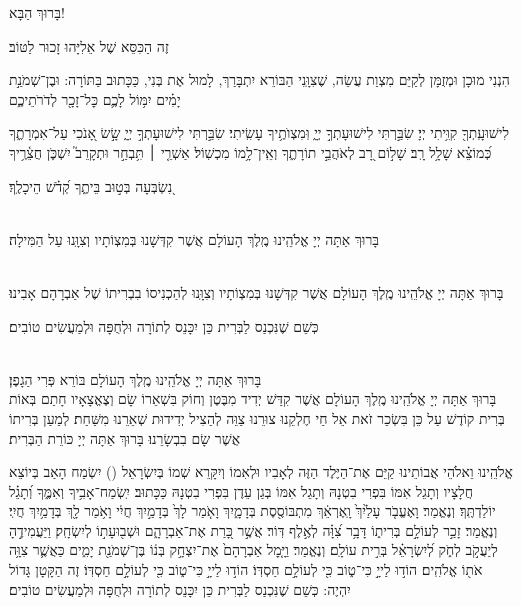 \documentclass[twoside, openany, parskip=half, 11pt]{book}
\begin{document}
\begin{Large}
בָּרוּךְ הַבָּא!

\end{Large}



זֶה הַכִּסֵּא שֶׁל אֵלִיָּהוּ זָכוּר לַטּוֹב׃

הִנְנִי מוּכָן וּמְזֻמָּן לְקַיֵּם מִצְוַת עֲשֵׂה, שֶׁצִוָּֽנִי הַבּוֹרֵא יִתְבָּרַךְ, לָמוּל אֶת בְּנִי, כַּכָּתוּב בַּתּוֹרָה:
וּבֶן־שְׁמֹנַ֣ת יָמִ֗ים יִמּ֥וֹל לָכֶ֛ם כׇּל־זָכָ֖ר לְדֹרֹתֵיכֶ֑ם

%
לִישׁוּעָֽתְךָ֖ קִוִּ֥יתִי יְיָ׃
שִׂבַּ֣רְתִּי לִישׁוּעָתְךָ֣ יְיָ֑ וּֽמִצְוֺתֶ֥יךָ עָשִֽׂיתִי׃ שִׂבַּ֣רְתִּי לִישׁוּעָתְךָ֣ יְיָ֑
שָׂ֣שׂ אָ֭נֹכִי עַל־אִמְרָתֶ֑ךָ כְּ֝מוֹצֵ֗א שָׁלָ֥ל רָֽב׃
שָׁל֣וֹם רָ֭ב לְאֹהֲבֵ֣י תוֹרָתֶ֑ךָ וְאֵֽין־לָ֥מוֹ מִכְשֽׁוֹל׃
אַשְׁרֵ֤י ׀ תִּ֥בְחַ֣ר וּתְקָרֵב֮ יִשְׁכֹּ֢ן חֲצֵ֫רֶ֥יךָ

\kahal
נִ֭שְׂבְּעָה בְּט֣וּב בֵּיתֶ֑ךָ קְ֝דֹ֗שׁ הֵיכָלֶֽךָ׃

\\
בָּרוּךְ אַתָּה יְיָ אֱלֹהֵֽינוּ מֶֽלֶךְ הָעוֹלָם אֲשֶׁר קִדְּשָׁנוּ בְּמִצְוֹתָיו וְצִוָּֽנוּ עַל הַמִּילָה׃

\\
בָּרוּךְ אַתָּה יְיָ אֱלֹהֵֽינוּ מֶֽלֶךְ הָעוֹלָם אֲשֶׁר קִדְּשָׁנוּ בְּמִצְוֹתָיו וְצִוָּֽנוּ לְהַכְנִיסוֹ בִבְרִיתוֹ שֶׁל אַבְרָהָם אָבִינוּ׃

\kahal
כְּשֵׁם שֶׁנִּכְנַס לַבְּרִית כֵּן יִכָּנֵס לְתוֹרָה וּלְחֻפָּה וּלְמַעֲשִׂים טוֹבִים׃

\\
\savri
בָּרוּךְ אַתָּה יְיָ אֱלֹהֵֽינוּ מֶֽלֶךְ הָעוֹלָם בּוֹרֵא פְּרִי הַגָפֶן׃\\
בָּרוּךְ אַתָּה יְיָ אֱלֹהֵֽינוּ מֶֽלֶךְ הָעוֹלָם אֲשֶׁר קִדַּשׁ יְדִיד מִבֶּטֶן וְחוֹק בִּשְׁאֵרוֹ שָׂם וְצֶאֱצָאָיו חָתַם בְּאוֹת בְּרִית קוֹדֶשׁ עַל כֵּן בִּשְׂכַר זֹאת אֵל חַי חֶלְקֵנוּ צוּרֵנוּ צַוֵּה לְהַצִיל יְדִידוּת שְׁאֵרֵנוּ מִשַּׁחַת׃ לְמַעַן בְּרִיתוֹ אֲשֶׁר שָׂם בִבְשָׂרֵנוּ׃ בָּרוּךְ אַתָּה יְיָ כּוֹרֵת הַבְּרִית׃

אֱלֹהֵֽינוּ וֵאלֹהֵי אֲבוֹתֵינוּ קַיֵּם אֶת־הַיֶּלֶד הַזֶּה לְאָבִיו וּלְאִמוֹ וְיִקָּרֵא שְׁמוֹ בְּיִשְׂרָאֵל () יִשְׂמַח הָאַב בְּיוֹצֵא חֲלָצָיו וְתָגֵל אִמּוֹ בִּפְרִי בִטְנָהּ וְתָגֵל אִמּוֹ בְּגַן עֵדֶן בִּפְרִי בִטְנָהּ כַּכָּתוּב׃
יִֽשְׂמַח־אָבִ֥יךָ וְאִמֶּ֑ךָ וְ֝תָגֵ֗ל יוֹלַדְתֶּֽךָ׃
וְנֶאֱמַר׃
וָאֶעֱבֹ֤ר עָלַ֙יִךְ֙ וָֽאֶרְאֵ֔ךְ מִתְבּוֹסֶ֖סֶת בְּדָמָ֑יִךְ וָאֹ֤מַר לָךְ֙ בְּדָמַ֣יִךְ חֲיִ֔י וָאֹ֥מַר לָ֖ךְ בְּדָמַ֥יִךְ חֲיִֽי׃
וְנֶאֱמַר׃
זָכַ֣ר לְעוֹלָ֣ם בְּרִית֑וֹ דָּבָ֥ר צִ֝וָּ֗ה לְאֶ֣לֶף דּֽוֹר׃ אֲשֶׁ֣ר כָּ֭רַת אֶת־אַבְרָהָ֑ם וּשְׁב֖וּעָת֣וֹ לְיִשְׂחָֽק׃ וַיַּעֲמִידֶ֣הָ לְיַעֲקֹ֣ב לְחֹ֑ק לְ֝יִשְׂרָאֵ֗ל בְּרִ֣ית עוֹלָֽם׃
וְנֶאֱמַר׃ 
וַיָּ֤מׇל אַבְרָהָם֙ אֶת־יִצְחָ֣ק בְּנ֔וֹ בֶּן־שְׁמֹנַ֖ת יָמִ֑ים כַּאֲשֶׁ֛ר צִוָּ֥ה אֹת֖וֹ אֱלֹהִֽים׃ 
הוֹד֣וּ לַייָ֣ כִּי־ט֑וֹב כִּ֖י לְעוֹלָ֣ם חַסְדּֽוֹ׃
\kahal
הוֹד֣וּ לַייָ֣ כִּי־ט֑וֹב כִּ֖י לְעוֹלָ֣ם חַסְדּֽוֹ׃
זֶה הַקָּטָן גָּדוֹל יִהְיֶה:
כְּשֵׁם שֶׁנִּכְנַס לַבְּרִית כֵּן יִכָּנֵס לְתוֹרָה וּלְחֻפָּה וּלְמַעֲשִׂים טוֹבִים׃
\end{document}
